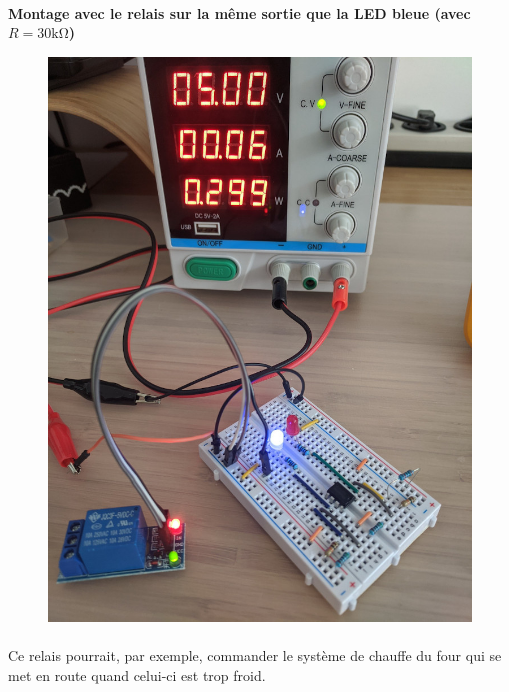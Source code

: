 \documentclass{article}
\begin{document}
\paragraph{}
\textbf{Montage avec le relais sur la même sortie que la LED bleue (avec $R = 30\si{\kilo\ohm}$)}
\begin{figure}[H]
    \centering
    \includegraphics[width=.6\linewidth]{./images/labo4-30k-relai.jpg}  
\end{figure}
\paragraph{}
Ce relais pourrait, par exemple, commander le système de chauffe du four qui se met en route quand celui-ci est trop froid.




\end{document}
